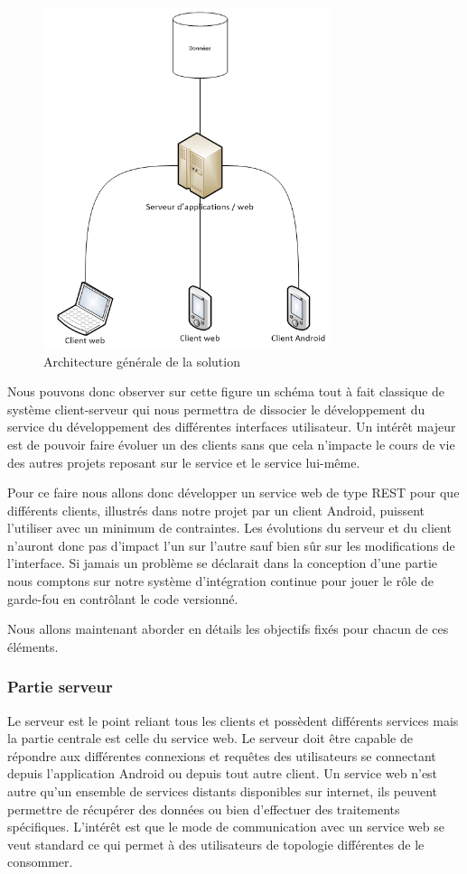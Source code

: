 \begin{figure}[H]
    \centering
    \includegraphics[height=10cm]{../infrastructure.png}
    \caption{Architecture générale de la solution}
    \label{architecture}
\end{figure}

Nous pouvons donc observer sur cette figure un schéma tout à fait classique de système client-serveur qui nous permettra de dissocier le développement du service du développement des différentes interfaces utilisateur. Un intérêt majeur est de pouvoir faire évoluer un des clients sans que cela n’impacte le cours de vie des autres projets reposant sur le service et le service lui-même.

Pour ce faire nous allons donc développer un service web de type REST pour que différents clients, illustrés dans notre projet par un client Android, puissent l’utiliser avec un minimum de contraintes. Les évolutions du serveur et du client n’auront donc pas d’impact l’un sur l’autre sauf bien sûr sur les modifications de l’interface. Si jamais un problème se déclarait dans la conception d’une partie nous comptons sur notre système d’intégration continue pour jouer le rôle de garde-fou en contrôlant le code versionné.

Nous allons maintenant aborder en détails les objectifs fixés pour chacun de ces éléments.

\subsubsection{Partie serveur}

Le serveur est le point reliant tous les clients et possèdent différents services mais la partie centrale est celle du service web. Le serveur doit être capable de répondre aux différentes connexions et requêtes des utilisateurs se connectant depuis l'application Android ou depuis tout autre client. Un service web n’est autre qu’un ensemble de services distants disponibles sur internet, ils peuvent permettre de récupérer des données ou bien d’effectuer des traitements spécifiques. L’intérêt est que le mode de communication avec un service web se veut standard ce qui permet à des utilisateurs de topologie différentes de le consommer.

